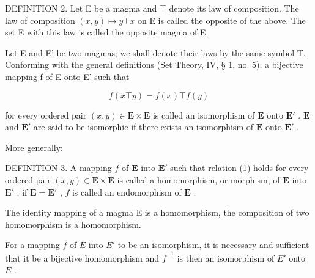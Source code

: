 DEFINITION 2. Let E be a magma and \(\top\) denote its law of composition. The law of composition \((x, y) \mapsto y \top x\) on E is called the opposite of the above. The set E with this law is called the opposite magma of E.

Let E and E' be two magmas; we shall denote their laws by the same symbol T. Conforming with the general definitions (Set Theory, IV, § 1, no. 5), a bijective mapping f of E onto E' such that

\[
f (x \top y) = f (x) \top f (y)\tag{1}
\]

for every ordered pair \((x, y) \in \mathbf{E} \times \mathbf{E}\) is called an isomorphism of \(\mathbf{E}\) onto \(\mathbf{E}'\) . \(\mathbf{E}\) and \(\mathbf{E}'\) are said to be isomorphic if there exists an isomorphism of \(\mathbf{E}\) onto \(\mathbf{E}'\) .

More generally:

DEFINITION 3. A mapping \(f\) of \(\mathbf{E}\) into \(\mathbf{E}'\) such that relation (1) holds for every ordered pair \((x, y) \in \mathbf{E} \times \mathbf{E}\) is called a homomorphism, or morphism, of \(\mathbf{E}\) into \(\mathbf{E}'\) ; if \(\mathbf{E} = \mathbf{E}'\) , \(f\) is called an endomorphism of \(\mathbf{E}\) .

The identity mapping of a magma E is a homomorphism, the composition of two homomorphism is a homomorphism.

For a mapping \(f\) of \(E\) into \(E'\) to be an isomorphism, it is necessary and sufficient that it be a bijective homomorphism and \(\overline{f}^{-1}\) is then an isomorphism of \(E'\) onto \(E\) .


